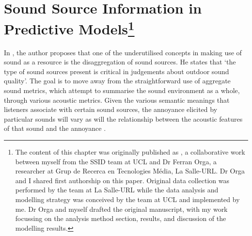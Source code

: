 \chapter[Sound Source Information in Predictive Models]{Sound Source Information in Predictive Models\footnote{The content of this chapter was originally published as \citet{Orga2021Multilevel}, a collaborative work between myself from the SSID team at UCL and Dr Ferran Orga, a researcher at Grup de Recerca en Tecnologies M{\'e}dia, La Salle-URL. Dr Orga and I shared first authorship on this paper. Original data collection was performed by the team at La Salle-URL while the data analysis and modelling strategy was conceived by the team at UCL and implemented by me. Dr Orga and myself drafted the original manuscript, with my work focussing on the analysis method section, results, and discussion of the modelling results.}}
\label{ch:mlmann}



In \citet{Brown2009acoustic}, the author proposes that one of the underutilised concepts in making use of sound as a resource is the disaggregation of sound sources. He states that `the type of sound sources present is critical in judgements about outdoor sound quality'. The goal is to move away from the straightforward use of aggregate sound metrics, which attempt to summarise the sound environment as a whole, through various acoustic metrics. Given the various semantic meanings that listeners associate with certain sound sources, the annoyance elicited by particular sounds will vary as will the relationship between the acoustic features of that sound and the annoyance \citep{LafayInvestigating}.

